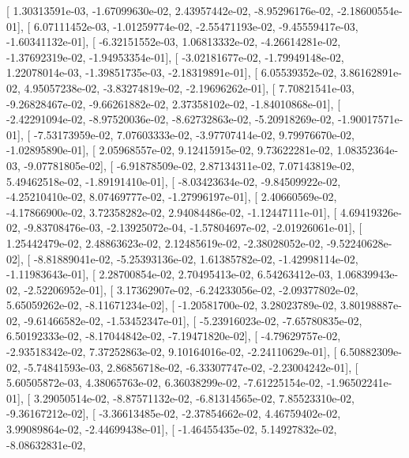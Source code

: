 \documentclass{article}
\begin{document}
       [  1.30313591e-03,  -1.67099630e-02,   2.43957442e-02,
         -8.95296176e-02,  -2.18600554e-01],
       [  6.07111452e-03,  -1.01259774e-02,  -2.55471193e-02,
         -9.45559417e-03,  -1.60341132e-01],
       [ -6.32151552e-03,   1.06813332e-02,  -4.26614281e-02,
         -1.37692319e-02,  -1.94953354e-01],
       [ -3.02181677e-02,  -1.79949148e-02,   1.22078014e-03,
         -1.39851735e-03,  -2.18319891e-01],
       [  6.05539352e-02,   3.86162891e-02,   4.95057238e-02,
         -3.83274819e-02,  -2.19696262e-01],
       [  7.70821541e-03,  -9.26828467e-02,  -9.66261882e-02,
          2.37358102e-02,  -1.84010868e-01],
       [ -2.42291094e-02,  -8.97520036e-02,  -8.62732863e-02,
         -5.20918269e-02,  -1.90017571e-01],
       [ -7.53173959e-02,   7.07603333e-02,  -3.97707414e-02,
          9.79976670e-02,  -1.02895890e-01],
       [  2.05968557e-02,   9.12415915e-02,   9.73622281e-02,
          1.08352364e-03,  -9.07781805e-02],
       [ -6.91878509e-02,   2.87134311e-02,   7.07143819e-02,
          5.49462518e-02,  -1.89191410e-01],
       [ -8.03423634e-02,  -9.84509922e-02,  -4.25210410e-02,
          8.07469777e-02,  -1.27996197e-01],
       [  2.40660569e-02,  -4.17866900e-02,   3.72358282e-02,
          2.94084486e-02,  -1.12447111e-01],
       [  4.69419326e-02,  -9.83708476e-03,  -2.13925072e-04,
         -1.57804697e-02,  -2.01926061e-01],
       [  1.25442479e-02,   2.48863623e-02,   2.12485619e-02,
         -2.38028052e-02,  -9.52240628e-02],
       [ -8.81889041e-02,  -5.25393136e-02,   1.61385782e-02,
         -1.42998114e-02,  -1.11983643e-01],
       [  2.28700854e-02,   2.70495413e-02,   6.54263412e-03,
          1.06839943e-02,  -2.52206952e-01],
       [  3.17362907e-02,  -6.24233056e-02,  -2.09377802e-02,
          5.65059262e-02,  -8.11671234e-02],
       [ -1.20581700e-02,   3.28023789e-02,   3.80198887e-02,
         -9.61466582e-02,  -1.53452347e-01],
       [ -5.23916023e-02,  -7.65780835e-02,   6.50192333e-02,
         -8.17044842e-02,  -7.19471820e-02],
       [ -4.79629757e-02,  -2.93518342e-02,   7.37252863e-02,
          9.10164016e-02,  -2.24110629e-01],
       [  6.50882309e-02,  -5.74841593e-03,   2.86856718e-02,
         -6.33307747e-02,  -2.23004242e-01],
       [  5.60505872e-03,   4.38065763e-02,   6.36038299e-02,
         -7.61225154e-02,  -1.96502241e-01],
       [  3.29050514e-02,  -8.87571132e-02,  -6.81314565e-02,
          7.85523310e-02,  -9.36167212e-02],
       [ -3.36613485e-02,  -2.37854662e-02,   4.46759402e-02,
          3.99089864e-02,  -2.44699438e-01],
       [ -1.46455435e-02,   5.14927832e-02,  -8.08632831e-02,
\end{document}
